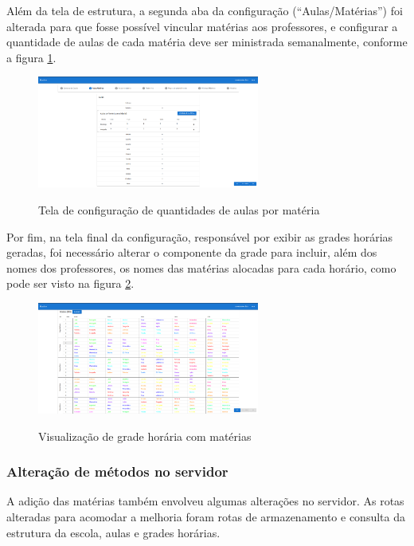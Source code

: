 Além da tela de estrutura, a segunda aba da configuração (``Aulas/Matérias'') foi alterada para que fosse possível vincular matérias aos professores, e configurar a quantidade de aulas de cada matéria deve ser ministrada semanalmente, conforme a figura \ref{fig:alteracaoAulas}.

\begin{figure}[!htb]
	\centering
	\caption{Tela de configuração de quantidades de aulas por matéria}
	\includegraphics[width=0.65\textwidth]{./dados/figuras/alteracaoAulas}
	\label{fig:alteracaoAulas}
\end{figure}

Por fim, na tela final da configuração, responsável por exibir as grades horárias geradas, foi necessário alterar o componente da grade para incluir, além dos nomes dos professores, os nomes das matérias alocadas para cada horário, como pode ser visto na figura \ref{fig:alteracaoHorario}.

\begin{figure}[!htb]
	\centering
	\caption{Visualização de grade horária com matérias}
	\includegraphics[width=0.65\textwidth]{./dados/figuras/alteracaoHorarios}
	\label{fig:alteracaoHorario}
\end{figure}

\subsubsection{Alteração de métodos no servidor}
A adição das matérias também envolveu algumas alterações no servidor. As rotas alteradas para acomodar a melhoria foram rotas de armazenamento e consulta da estrutura da escola, aulas e grades horárias.

